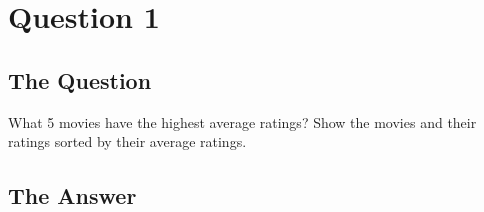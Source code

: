 \section{Question 1}

\subsection{The Question}

\begin{flushleft}

What 5 movies have the highest average ratings? Show the movies
and their ratings sorted by their average ratings.

\end{flushleft}
\subsection{The Answer}


